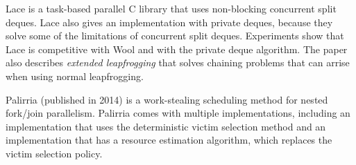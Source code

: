 Lace \cite{lace} is a task-based parallel C library that uses non-blocking concurrent split deques. Lace also gives an implementation with private deques, because they solve some of the limitations of concurrent split deques. Experiments show that Lace is competitive with Wool and with the private deque algorithm. The paper also describes \emph{extended leapfrogging} that solves chaining problems that can arrise when using normal leapfrogging.

Palirria \cite{varisteas2014palirria} (published in 2014) is a work-stealing scheduling method for nested fork/join parallelism. Palirria comes with multiple implementations, including an implementation that uses the deterministic victim selection method and an implementation that has a resource estimation algorithm, which replaces the victim selection policy.